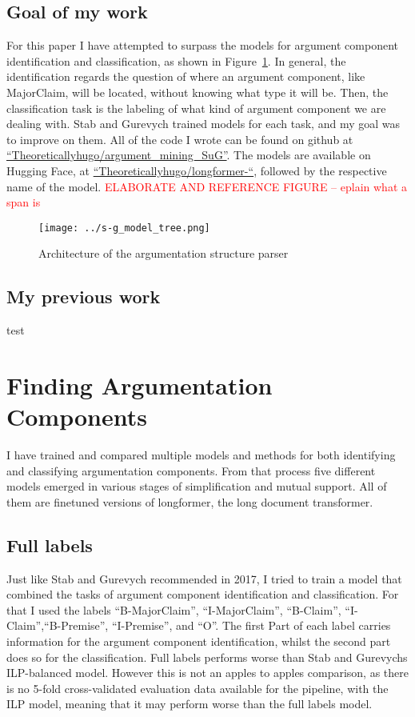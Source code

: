 \documentclass[12]{article}
\theoremstyle{mytheoremstyle}
\theoremstyle{mytheoremstyle}
\theoremstyle{myproblemstyle}
\begin{document}
  \subsection{Goal of my work}
  For this paper I have attempted to surpass the models for argument component identification and classification, as shown in Figure~\ref{fig:model_tree}. In general, the identification regards the question of where an argument component, like MajorClaim, will be located, without knowing what type it will be. Then, the classification task is the labeling of what kind of argument component we are dealing with. Stab and Gurevych trained models for each task, and my goal was to improve on them. All of the code I wrote can be found on github at \href{https://github.com/Theoreticallyhugo/argument_mining_SuG}{``Theoreticallyhugo/argument\_mining\_SuG''}. The models are available on Hugging Face, at \href{https://huggingface.co/Theoreticallyhugo}{``Theoreticallyhugo/longformer-``}, followed by the respective name of the model. \textcolor{red}{ELABORATE AND REFERENCE FIGURE -- eplain what a span is} 
  \begin{figure}[!h]
    \centering
    \texttt{[image: ../s-g\_model\_tree.png]}
    \caption{Architecture of the argumentation structure parser}
    \label{fig:model_tree}
  \end{figure}
  \subsection{My previous work}
  test
  \section{Finding Argumentation Components}
  I have trained and compared multiple models and methods for both identifying and classifying argumentation components. From that process five different models emerged in various stages of simplification and mutual support. All of them are finetuned versions of longformer\cite{beltagy2020longformer}, the long document transformer. 
  \subsection{Full labels} \label{full labels}
  Just like Stab and Gurevych recommended in 2017, I tried to train a model that combined the tasks of argument component identification and classification. For that I used the labels ``B-MajorClaim'', ``I-MajorClaim'', ``B-Claim'', ``I-Claim'',``B-Premise'', ``I-Premise'', and ``O''. The first Part of each label carries information for the argument component identification, whilst the second part does so for the classification. Full labels performs worse than Stab and Gurevychs ILP-balanced model\cite{stab-gurevych-2017-parsing}. However this is not an apples to apples comparison, as there is no 5-fold cross-validated evaluation data available for the pipeline, with the ILP model, meaning that it may perform worse than the full labels model. 
\end{document}
